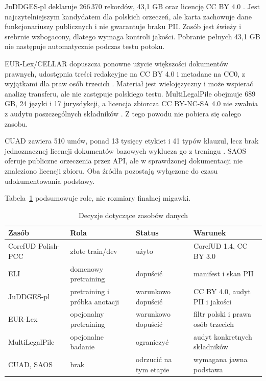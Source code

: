 JuDDGES-pl deklaruje 266\,370 rekordów, 43,1 GB oraz licencję CC BY 4.0 \cite{juddges_2026_pl}. Jest najczytelniejszym kandydatem dla polskich orzeczeń, ale karta zachowuje dane funkcjonariuszy publicznych i nie gwarantuje braku PII. Zasób jest świeży i srebrnie wzbogacony, dlatego wymaga kontroli jakości. Pobranie pełnych 43,1 GB nie następuje automatycznie podczas testu potoku.

EUR-Lex/CELLAR dopuszcza ponowne użycie większości dokumentów prawnych, udostępnia treści redakcyjne na CC BY 4.0 i metadane na CC0, z wyjątkami dla praw osób trzecich \cite{eu_2026_eurlex_reuse}. Materiał jest wielojęzyczny i może wspierać analizę transferu, ale nie zastępuje polskiego testu. MultiLegalPile obejmuje 689 GB, 24 języki i 17 jurysdykcji, a licencja zbiorcza CC BY-NC-SA 4.0 nie zwalnia z audytu poszczególnych składników \cite{niklaus_2023_multilegalpile}. Z tego powodu nie pobiera się całego zasobu.

CUAD zawiera 510 umów, ponad 13 tysięcy etykiet i 41 typów klauzul, lecz brak jednoznacznej licencji dokumentów bazowych wyklucza go z treningu \cite{hendrycks_2021_cuad}. SAOS oferuje publiczne orzeczenia przez API, ale w sprawdzonej dokumentacji nie znaleziono licencji zbioru. Oba źródła pozostają wyłączone do czasu udokumentowania podstawy.

Tabela~\ref{tab:decyzje-dane} podsumowuje role, nie rozmiary finalnej migawki.

\begin{table}[htbp]
  \centering
  \caption{Decyzje dotyczące zasobów danych}
  \label{tab:decyzje-dane}
  \begin{tabular}{p{}p{}p{}p{}}
    \toprule
    Zasób & Rola & Status & Warunek \\
    \midrule
    CorefUD Polish-PCC & złote train/dev & użyto & CorefUD 1.4, CC BY 3.0 \\
    ELI & domenowy pretraining & dopuścić & manifest i skan PII \\
    JuDDGES-pl & pretraining i próbka anotacji & warunkowo dopuścić & CC BY 4.0, audyt PII i jakości \\
    EUR-Lex & opcjonalny pretraining & warunkowo dopuścić & filtr polski i prawa osób trzecich \\
    MultiLegalPile & opcjonalne badanie & ograniczyć & audyt konkretnych składników \\
    CUAD, SAOS & brak & odrzucić na tym etapie & wymagana jawna podstawa \\
    \bottomrule
  \end{tabular}
\end{table}

